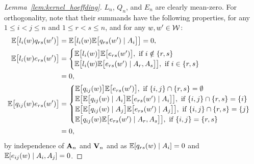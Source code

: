 \begin{proof}[Lemma~\ref{lem:kernel_hoeffding}]
  $L_n$, $Q_n$, and $E_n$
  are clearly mean-zero.
  For orthogonality,
  note that their summands
  have the following properties,
  for any $1 \leq i < j \leq n$
  and $1 \leq r < s \leq n$,
  and for any $w, w' \in \mathcal{W}$:
  \begin{align*}
    \mathbb{E}\big[
      l_i(w)
      q_{rs}(w')
    \big]
    &=
    \mathbb{E}\big[
      l_i(w)
      \mathbb{E}\big[
        q_{rs}(w') \mid A_i
      \big]
    \big]
    = 0, \\
    \mathbb{E}\big[
      l_i(w)
      e_{rs}(w')
    \big]
    &=
    \begin{cases}
      \mathbb{E}\big[
        l_i(w)
      \big]
      \mathbb{E}\big[
        e_{rs}(w')
      \big],
      \text{ if } i \notin \{r,s\} \\
      \mathbb{E}\big[
        l_i(w)
        \mathbb{E}\big[
          e_{rs}(w') \mid A_r, A_s
        \big]
      \big],
      \text{ if } i \in \{r,s\}
    \end{cases} \\
    &=
    0, \\
    \mathbb{E}\big[
      q_{i j}(w)
      e_{rs}(w')
    \big]
    &=
    \begin{cases}
      \mathbb{E}\big[
        q_{i j}(w)
      \big]
      \mathbb{E}\big[
        e_{rs}(w')
      \big],
      \text{ if } \{i,j\} \cap \{r,s\} = \emptyset \\
      \mathbb{E}\big[
        \mathbb{E}\big[
          q_{i j}(w) \mid A_i
        \big]
        \mathbb{E}\big[
          e_{rs}(w') \mid A_i
        \big]
      \big],
      \text{ if } \{i,j\} \cap \{r,s\} = \{i\}     \\
      \mathbb{E}\big[
        \mathbb{E}\big[
          q_{i j}(w) \mid A_j
        \big]
        \mathbb{E}\big[
          e_{rs}(w') \mid A_j
        \big]
      \big],
      \text{ if } \{i,j\} \cap \{r,s\} = \{j\}     \\
      \mathbb{E}\big[
        q_{i j}(w)
        \mathbb{E}\big[
          e_{rs}(w') \mid A_r, A_s
        \big]
      \big],
      \text{ if } \{i,j\} = \{r,s\}
    \end{cases} \\
    &=
    0,
  \end{align*}
  by independence of $\mathbf{A}_n$ and $\mathbf{V}_n$
  and as $\mathbb{E}[q_{rs}(w) \mid A_i] = 0$
  and $\mathbb{E}[e_{i j}(w) \mid A_i, A_j] = 0$.
\end{proof}

